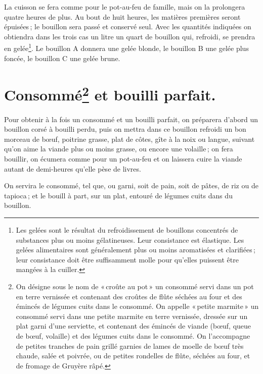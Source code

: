 La cuisson se fera comme pour le pot-au-feu de famille, mais on la prolongera
quatre heures de plus. Au bout de huit heures, les matières premières seront
épuisées ; le bouillon sera passé et conservé seul. Avec les quantités
indiquées on obtiendra dans les trois cas un litre un quart de bouillon qui,
refroidi, se prendra en gelée\footnote{Les gelées sont le résultat du
refroidissement de bouillons concentrés de substances plus ou moins
gélatineuses. Leur consistance est élastique. Les gelées alimentaires sont
généralement plus ou moins aromatisées et clarifiées ; leur consistance doit
être suffisamment molle pour qu'elles puissent être mangées à la cuiller.}. Le
bouillon A donnera une gelée blonde, le bouillon B une gelée plus foncée, le
bouillon C une gelée brune.

\section*{\centering Consommé\footnote{ On désigne sous le nom de
« croûte au pot » un consommé servi dans un pot en terre vernissée et contenant
des croûtes de flûte séchées au four et des émincés de légumes cuits dans le
consommé. 
\protect\endgraf
On appelle « petite marmite » un consommé servi dans une petite
marmite en terre vernissée, dressée sur un plat garni d'une serviette, et
contenant des émincés de viande (bœuf, queue de bœuf, volaille) et des légumes
cuits dans le consommé. On l'accompagne de petites tranches de pain grillé
garnies de lames de moelle de bœuf très chaude, salée et poivrée, ou de petites
rondelles de flûte, séchées au four, et de fromage de Gruyère râpé.} et bouilli
parfait.}

Pour obtenir à la fois un consommé et un bouilli parfait, on préparera d'abord
un bouillon corsé à bouilli perdu, puis on mettra dans ce bouillon refroidi un
bon morceau de bœuf, poitrine grasse, plat de côtes, gîte à la noix ou langue,
suivant qu'on aime la viande plus ou moins grasse, ou encore une volaille ; on
fera bouillir, on écumera comme pour un pot-au-feu et on laissera cuire la
viande autant de demi-heures qu'elle pèse de livres.

On servira le consommé, tel que, ou garni, soit de pain, soit de pâtes, de riz
ou de tapioca ; et le bouill à part, sur un plat, entouré de légumes cuits dans du
bouillon.

